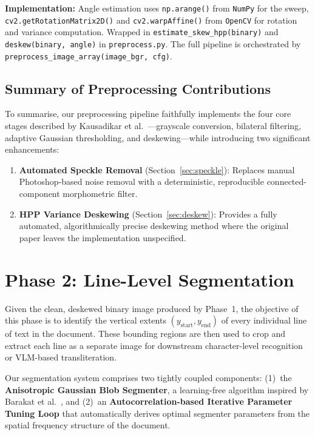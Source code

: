 \documentclass[12pt, a4paper]{article}
\begin{document}
\textbf{Implementation:} Angle estimation uses \texttt{np.arange()} from \texttt{NumPy} for the sweep, \texttt{cv2.getRotationMatrix2D()} and \texttt{cv2.warpAffine()} from \texttt{OpenCV} for rotation and variance computation. Wrapped in \texttt{estimate\_skew\_hpp(binary)} and \texttt{deskew(binary, angle)} in \texttt{preprocess.py}. The full pipeline is orchestrated by \texttt{preprocess\_image\_array(image\_bgr, cfg)}.


\subsection{Summary of Preprocessing Contributions}

To summarise, our preprocessing pipeline faithfully implements the four core stages described by Kausadikar et al.~\cite{kausadikar2025}---grayscale conversion, bilateral filtering, adaptive Gaussian thresholding, and deskewing---while introducing two significant enhancements:

\begin{enumerate}
    \item \textbf{Automated Speckle Removal} (Section~\ref{sec:speckle}): Replaces manual Photoshop-based noise removal with a deterministic, reproducible connected-component morphometric filter.
    \item \textbf{HPP Variance Deskewing} (Section~\ref{sec:deskew}): Provides a fully automated, algorithmically precise deskewing method where the original paper leaves the implementation unspecified.
\end{enumerate}


\section{Phase 2: Line-Level Segmentation}

Given the clean, deskewed binary image produced by Phase~1, the objective of this phase is to identify the vertical extents $(y_{\text{start}}, y_{\text{end}})$ of every individual line of text in the document. These bounding regions are then used to crop and extract each line as a separate image for downstream character-level recognition or VLM-based transliteration.

Our segmentation system comprises two tightly coupled components: (1)~the \textbf{Anisotropic Gaussian Blob Segmenter}, a learning-free algorithm inspired by Barakat et al.~\cite{barakat2020}, and (2)~an \textbf{Autocorrelation-based Iterative Parameter Tuning Loop} that automatically derives optimal segmenter parameters from the spatial frequency structure of the document.
\end{document}
